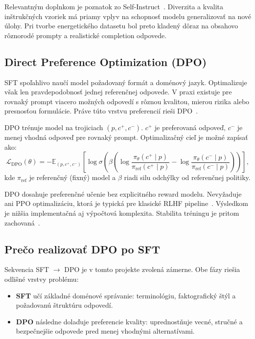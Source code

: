 Relevantným doplnkom je poznatok zo Self-Instruct~\cite{Wang2023SelfInstruct}. Diverzita a kvalita inštrukčných vzoriek má priamy vplyv na schopnosť modelu generalizovať na nové úlohy. Pri tvorbe energetického datasetu bol preto kladený dôraz na obsahovo rôznorodé prompty a realistické completion odpovede.

\subsection{Direct Preference Optimization (DPO)}

SFT spoľahlivo naučí model požadovaný formát a doménový jazyk. Optimalizuje však len pravdepodobnosť jednej referenčnej odpovede. V praxi existuje pre rovnaký prompt viacero možných odpovedí s rôznou kvalitou, mierou rizika alebo presnosťou formulácie. Práve túto vrstvu preferencií rieši DPO~\cite{Rafailov2023DPO}.

DPO trénuje model na trojiciach $(p, c^{+}, c^{-})$. $c^{+}$ je preferovaná odpoveď, $c^{-}$ je menej vhodná odpoveď pre rovnaký prompt. Optimalizačný cieľ je možné zapísať ako:
\begin{equation}
\mathcal{L}_{\mathrm{DPO}}(\theta) = -\mathbb{E}_{(p,c^{+},c^{-})}\left[\log \sigma\left(\beta \left(\log \frac{\pi_{\theta}(c^{+}\mid p)}{\pi_{\mathrm{ref}}(c^{+}\mid p)} - \log \frac{\pi_{\theta}(c^{-}\mid p)}{\pi_{\mathrm{ref}}(c^{-}\mid p)}\right)\right)\right],
\end{equation}
kde $\pi_{\mathrm{ref}}$ je referenčný (fixný) model a $\beta$ riadi silu odchýlky od referenčnej politiky.

DPO dosahuje preferenčné učenie bez explicitného reward modelu. Nevyžaduje ani PPO optimalizáciu, ktorá je typická pre klasické RLHF pipeline~\cite{Ouyang2022InstructGPT}. Výsledkom je nižšia implementačná aj výpočtová komplexita. Stabilita tréningu je pritom zachovaná~\cite{Rafailov2023DPO}.

\subsection{Prečo realizovať DPO po SFT}

Sekvencia SFT $\rightarrow$ DPO je v tomto projekte zvolená zámerne. Obe fázy riešia odlišné vrstvy problému:

\begin{itemize}
    \item \textbf{SFT} učí základné doménové správanie: terminológiu, faktografický štýl a požadovanú štruktúru odpovedí.
    \item \textbf{DPO} následne dolaďuje preferencie kvality: uprednostňuje vecné, stručné a bezpečnejšie odpovede pred menej vhodnými alternatívami.
\end{itemize}

